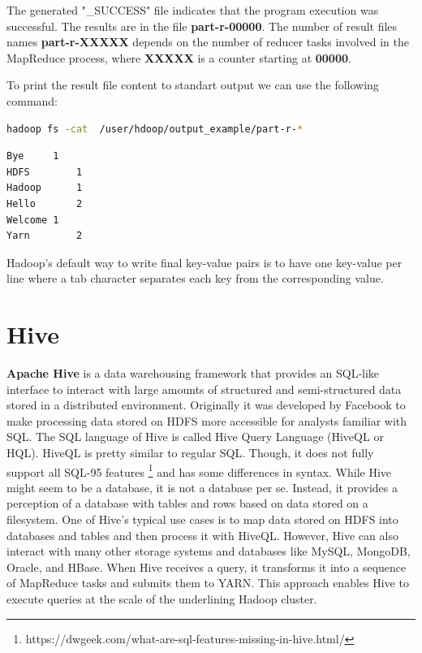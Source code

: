\documentclass[12pt,english]{book}
\begin{document}
The generated "\_SUCCESS" file indicates that the program execution was successful.
The results are in the file \textbf{part-r-00000}. 
The number of result files names \textbf{part-r-XXXXX} depends on the number of reducer tasks involved in the MapReduce process, where \textbf{XXXXX} is a counter starting at \textbf{00000}.

To print the result file content to standart output we can use the following command:

\begin{lstlisting}[language=bash, frame=single, basicstyle=\footnotesize]
hadoop fs -cat  /user/hdoop/output_example/part-r-*
\end{lstlisting}
 
\begin{lstlisting}[language=bash, frame=single, basicstyle=\footnotesize]
Bye		1
HDFS		1
Hadoop		1
Hello		2
Welcome	1
Yarn		2 
\end{lstlisting}

Hadoop's default way to write final key-value pairs is to have one key-value per line where a tab character separates each key from the corresponding value.

\section{Hive}

\textbf{Apache Hive} is a data warehousing framework that provides an SQL-like interface to interact with large amounts of structured and semi-structured data stored in a distributed environment.
Originally it was developed by Facebook to make processing data stored on HDFS more accessible for analysts familiar with SQL.
The SQL language of Hive is called Hive Query Language (HiveQL or HQL).
HiveQL is pretty similar to regular SQL.
Though, it does not fully support all SQL-95 features \footnote{https://dwgeek.com/what-are-sql-features-missing-in-hive.html/} and has some differences in syntax.
While Hive might seem to be a database, it is not a database per se. 
Instead, it provides a perception of a database with tables and rows based on data stored on a filesystem.
One of Hive's typical use cases is to map data stored on HDFS into databases and tables and then process it with HiveQL.
However, Hive can also interact with many other storage systems and databases like MySQL, MongoDB, Oracle, and HBase.
When Hive receives a query, it transforms it into a sequence of MapReduce tasks and submits them to YARN.
This approach enables Hive to execute queries at the scale of the underlining Hadoop cluster.
\end{document}
